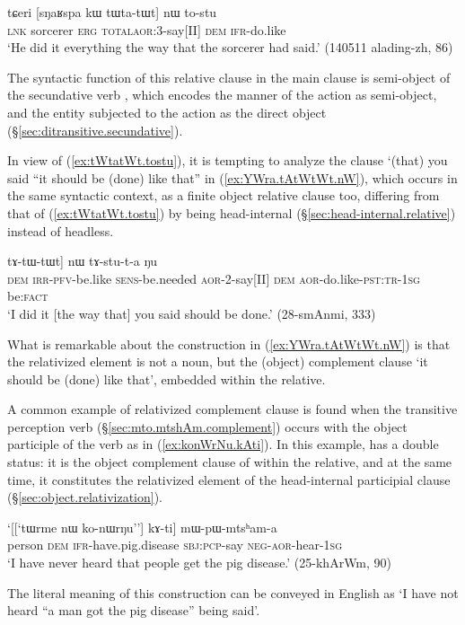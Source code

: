 \begin{exe}
\ex \label{ex:tWtatWt.tostu}
\gll tɕeri [sŋaʁspa kɯ tɯ\redp{}ta-tɯt] nɯ to-stu \\
\textsc{lnk} sorcerer \textsc{erg} \textsc{total}\redp{}\textsc{aor}:3\flobv{}-say[II] \textsc{dem} \textsc{ifr}-do.like \\
\glt `He did it everything the way that the sorcerer had said.' (140511 alading-zh, 86)
\end{exe} 

The syntactic function of this relative clause in the main clause is semi-object of the secundative verb , which encodes the manner of the action as semi-object, and the entity subjected to the action as the direct object  (§\ref{sec:ditransitive.secundative}). 

In view of (\ref{ex:tWtatWt.tostu}), it is tempting to analyze the clause  `(that) you said ``it should be (done) like that'' in (\ref{ex:YWra.tAtWtWt.nW}), which occurs in the same syntactic context, as a finite object relative clause too, differing from that of (\ref{ex:tWtatWt.tostu}) by being head-internal (§\ref{sec:head-internal.relative}) instead of headless.

\begin{exe}
\ex \label{ex:YWra.tAtWtWt.nW}
\gll [[``\textbf{nɯ} \textbf{a-tɤ-fse} \textbf{ɲɯ-ra}"] tɤ-tɯ-tɯt] nɯ tɤ-stu-t-a ŋu \\
\textsc{dem} \textsc{irr}-\textsc{pfv}-be.like \textsc{sens}-be.needed \textsc{aor}-2-say[II] \textsc{dem} \textsc{aor}-do.like-\textsc{pst}:\textsc{tr}-\textsc{1sg} be:\textsc{fact} \\
\glt `I did it [the way that] you said should be done.' (28-smAnmi, 333)
\end{exe} 

What is remarkable about the construction in (\ref{ex:YWra.tAtWtWt.nW}) is that the relativized element is not a noun, but the (object) complement clause  `it should be (done) like that', embedded within the relative. 

A common example of relativized complement clause is found when the transitive perception verb  (§\ref{sec:mto.mtshAm.complement}) occurs with the object participle  of the verb  as in (\ref{ex:konWrNu.kAti}). In this example,  has a double status: it is the object complement clause of  within the relative, and at the same time, it constitutes the relativized element of the head-internal participial clause (§\ref{sec:object.relativization}). 

\begin{exe}
\ex \label{ex:konWrNu.kAti}
\gll `[[`tɯrme nɯ ko-nɯrŋu''] kɤ-ti] mɯ-pɯ-mtsʰam-a \\
person \textsc{dem} \textsc{ifr}-have.pig.disease \textsc{sbj}:\textsc{pcp}-say \textsc{neg}-\textsc{aor}-hear-\textsc{1sg} \\
\glt `I have never heard that people get the pig disease.' (25-khArWm, 90)
\end{exe} 

The literal meaning of this construction can be conveyed in English as `I have not heard ``a man got the pig disease'' being said'.
